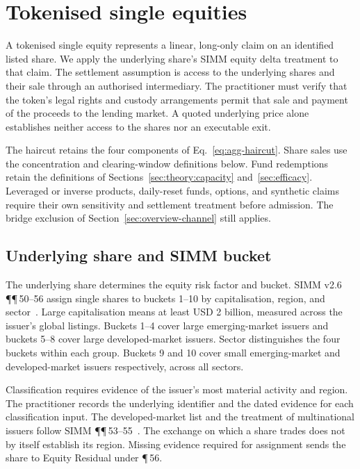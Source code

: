 \section{Tokenised single equities}\label{sec:equities}

A tokenised single equity represents a linear, long-only claim on an identified
listed share. We apply the underlying share's SIMM equity delta treatment to that
claim. The settlement assumption is access to the underlying shares and their sale
through an authorised intermediary. The practitioner must verify that the token's
legal rights and custody arrangements permit that sale and payment of the proceeds
to the lending market. A quoted underlying price alone establishes neither access
to the shares nor an executable exit.

The haircut retains the four components of Eq.~\eqref{eq:agg-haircut}. Share sales
use the concentration and clearing-window definitions below. Fund redemptions
retain the definitions of Sections~\ref{sec:theory:capacity}
and~\ref{sec:efficacy}. Leveraged or inverse products, daily-reset funds, options,
and synthetic claims require their own sensitivity and settlement treatment before
admission. The bridge exclusion of Section~\ref{sec:overview-channel} still applies.

\subsection{Underlying share and SIMM bucket}\label{sec:equity-buckets}

The underlying share determines the equity risk factor and bucket. SIMM v2.6
\P\P\,50--56 assign single shares to buckets 1--10 by capitalisation, region, and
sector~\citep{isda_simm_v2_6}. Large capitalisation means at least USD 2 billion,
measured across the issuer's global listings. Buckets 1--4 cover large emerging-market
issuers and buckets 5--8 cover large developed-market issuers. Sector distinguishes
the four buckets within each group. Buckets 9 and 10 cover small emerging-market
and developed-market issuers respectively, across all sectors.

Classification requires evidence of the issuer's most material activity and region.
The practitioner records the underlying identifier and the dated evidence for each
classification input. The developed-market list and the treatment of multinational
issuers follow SIMM \P\P\,53--55~\citep{isda_simm_v2_6}. The exchange on which a
share trades does not by itself establish its region. Missing evidence required for
assignment sends the share to Equity Residual under \P\,56.

